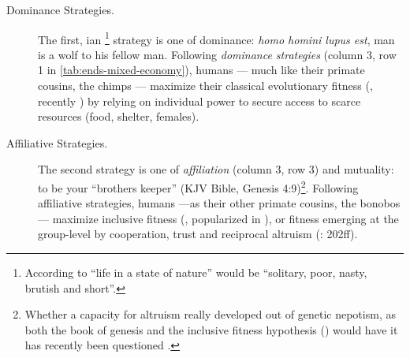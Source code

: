 \begin{description}
	\item[Dominance Strategies.] The first, \citeauthor{Hobbes-1651-aa}ian \citeyearpar{Hobbes-1651-aa}\footnote{
		According to \cite{Hobbes-1651-aa} ``life in a state of nature'' would be ``solitary, poor, nasty, brutish and short''.} 
	strategy is one of dominance: \emph{homo homini lupus est}, man is a wolf to his fellow man. Following \emph{dominance strategies} (column 3, row 1 in \autoref{tab:ends-mixed-economy}), humans --- much like their primate cousins, the chimps --- maximize their classical evolutionary fitness (\citealt{Darwin1859}, recently \citealt{Dawkins1976}) by relying on individual power to secure access to scarce resources (food, shelter, females).
	
	\item[Affiliative Strategies.] The second strategy is one of \emph{affiliation} (column 3, row 3) and mutuality: to be your ``brothers keeper'' (\gls{KJV} Bible, Genesis 4:9)\footnote{
		Whether a capacity for altruism really developed out of genetic nepotism, as both the book of genesis and the inclusive fitness hypothesis (\citealt{Hamilton1964,Wilson1975}) would have it has recently been questioned \citep{Wilson2012}.}. Following affiliative strategies, humans ---as their other primate cousins, the bonobos --- maximize inclusive fitness (\citealt{Hamilton1964}, popularized in \citealt{Wilson1975}), or fitness emerging at the group-level \citep{Wilson2012} by cooperation, trust and reciprocal altruism (\citealt{Pickett-2009-kx}: 202ff). 
\end{description}



